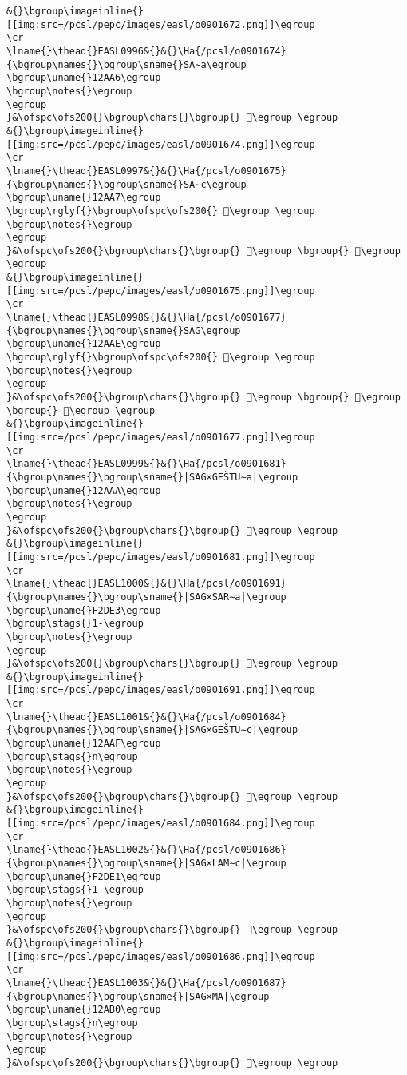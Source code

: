 \begin{verbatim}
&{}\bgroup\imageinline{}[[img:src=/pcsl/pepc/images/easl/o0901672.png]]\egroup
\cr
\lname{}\thead{}EASL0996&{}&{}\Ha{/pcsl/o0901674}{\bgroup\names{}\bgroup\sname{}SA∼a\egroup
\bgroup\uname{}12AA6\egroup
\bgroup\notes{}\egroup
\egroup
}&\ofspc\ofs200{}\bgroup\chars{}\bgroup{} 𒪦\egroup \egroup
&{}\bgroup\imageinline{}[[img:src=/pcsl/pepc/images/easl/o0901674.png]]\egroup
\cr
\lname{}\thead{}EASL0997&{}&{}\Ha{/pcsl/o0901675}{\bgroup\names{}\bgroup\sname{}SA∼c\egroup
\bgroup\uname{}12AA7\egroup
\bgroup\rglyf{}\bgroup\ofspc\ofs200{} 𒪧\egroup \egroup
\bgroup\notes{}\egroup
\egroup
}&\ofspc\ofs200{}\bgroup\chars{}\bgroup{} 𒪧\egroup \bgroup{} 𒪨\egroup \egroup
&{}\bgroup\imageinline{}[[img:src=/pcsl/pepc/images/easl/o0901675.png]]\egroup
\cr
\lname{}\thead{}EASL0998&{}&{}\Ha{/pcsl/o0901677}{\bgroup\names{}\bgroup\sname{}SAG\egroup
\bgroup\uname{}12AAE\egroup
\bgroup\rglyf{}\bgroup\ofspc\ofs200{} 𒪮\egroup \egroup
\bgroup\notes{}\egroup
\egroup
}&\ofspc\ofs200{}\bgroup\chars{}\bgroup{} 𒪩\egroup \bgroup{} 𒪮\egroup \bgroup{} 𒪲\egroup \egroup
&{}\bgroup\imageinline{}[[img:src=/pcsl/pepc/images/easl/o0901677.png]]\egroup
\cr
\lname{}\thead{}EASL0999&{}&{}\Ha{/pcsl/o0901681}{\bgroup\names{}\bgroup\sname{}|SAG×GEŠTU∼a|\egroup
\bgroup\uname{}12AAA\egroup
\bgroup\notes{}\egroup
\egroup
}&\ofspc\ofs200{}\bgroup\chars{}\bgroup{} 𒪪\egroup \egroup
&{}\bgroup\imageinline{}[[img:src=/pcsl/pepc/images/easl/o0901681.png]]\egroup
\cr
\lname{}\thead{}EASL1000&{}&{}\Ha{/pcsl/o0901691}{\bgroup\names{}\bgroup\sname{}|SAG×SAR∼a|\egroup
\bgroup\uname{}F2DE3\egroup
\bgroup\stags{}1-\egroup
\bgroup\notes{}\egroup
\egroup
}&\ofspc\ofs200{}\bgroup\chars{}\bgroup{} 󲷣\egroup \egroup
&{}\bgroup\imageinline{}[[img:src=/pcsl/pepc/images/easl/o0901691.png]]\egroup
\cr
\lname{}\thead{}EASL1001&{}&{}\Ha{/pcsl/o0901684}{\bgroup\names{}\bgroup\sname{}|SAG×GEŠTU∼c|\egroup
\bgroup\uname{}12AAF\egroup
\bgroup\stags{}n\egroup
\bgroup\notes{}\egroup
\egroup
}&\ofspc\ofs200{}\bgroup\chars{}\bgroup{} 𒪯\egroup \egroup
&{}\bgroup\imageinline{}[[img:src=/pcsl/pepc/images/easl/o0901684.png]]\egroup
\cr
\lname{}\thead{}EASL1002&{}&{}\Ha{/pcsl/o0901686}{\bgroup\names{}\bgroup\sname{}|SAG×LAM∼c|\egroup
\bgroup\uname{}F2DE1\egroup
\bgroup\stags{}1-\egroup
\bgroup\notes{}\egroup
\egroup
}&\ofspc\ofs200{}\bgroup\chars{}\bgroup{} 󲷡\egroup \egroup
&{}\bgroup\imageinline{}[[img:src=/pcsl/pepc/images/easl/o0901686.png]]\egroup
\cr
\lname{}\thead{}EASL1003&{}&{}\Ha{/pcsl/o0901687}{\bgroup\names{}\bgroup\sname{}|SAG×MA|\egroup
\bgroup\uname{}12AB0\egroup
\bgroup\stags{}n\egroup
\bgroup\notes{}\egroup
\egroup
}&\ofspc\ofs200{}\bgroup\chars{}\bgroup{} 𒪰\egroup \egroup

\end{verbatim}
